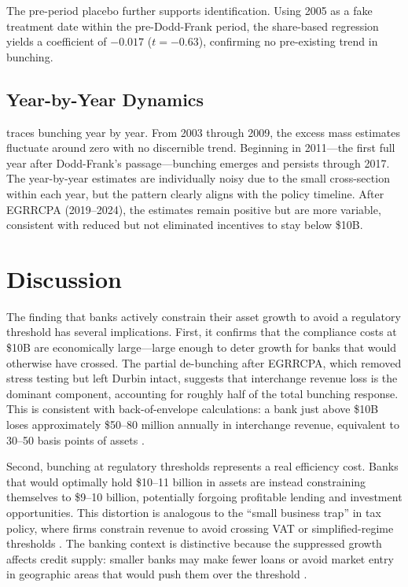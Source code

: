\documentclass[12pt]{article}
\begin{document}
The pre-period placebo further supports identification. Using 2005 as a fake treatment date within the pre-Dodd-Frank period, the share-based regression yields a coefficient of $-0.017$ ($t = -0.63$), confirming no pre-existing trend in bunching.



\subsection{Year-by-Year Dynamics}

 traces bunching year by year. From 2003 through 2009, the excess mass estimates fluctuate around zero with no discernible trend. Beginning in 2011---the first full year after Dodd-Frank's passage---bunching emerges and persists through 2017. The year-by-year estimates are individually noisy due to the small cross-section within each year, but the pattern clearly aligns with the policy timeline. After EGRRCPA (2019--2024), the estimates remain positive but are more variable, consistent with reduced but not eliminated incentives to stay below \$10B.



\section{Discussion}
\label{sec:discussion}

The finding that banks actively constrain their asset growth to avoid a regulatory threshold has several implications. First, it confirms that the compliance costs at \$10B are economically large---large enough to deter growth for banks that would otherwise have crossed. The partial de-bunching after EGRRCPA, which removed stress testing but left Durbin intact, suggests that interchange revenue loss is the dominant component, accounting for roughly half of the total bunching response. This is consistent with back-of-envelope calculations: a bank just above \$10B loses approximately \$50--80 million annually in interchange revenue, equivalent to 30--50 basis points of assets \citep{Kay2023}.

Second, bunching at regulatory thresholds represents a real efficiency cost. Banks that would optimally hold \$10--11 billion in assets are instead constraining themselves to \$9--10 billion, potentially forgoing profitable lending and investment opportunities. This distortion is analogous to the ``small business trap'' in tax policy, where firms constrain revenue to avoid crossing VAT or simplified-regime thresholds \citep{Kleven2016, Harju2019}. The banking context is distinctive because the suppressed growth affects credit supply: smaller banks may make fewer loans or avoid market entry in geographic areas that would push them over the threshold \citep{Cortés2020}.
\end{document}
